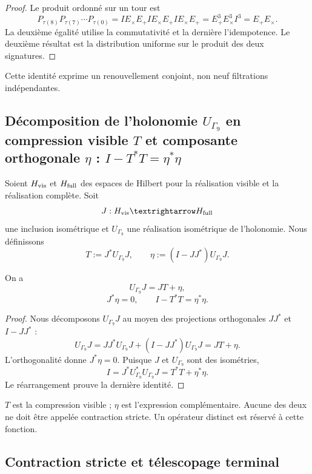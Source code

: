 \begin{proof}
Le produit ordonné sur un tour est
\[
 P_{\tau(8)}P_{\tau(7)}\cdots P_{\tau(0)}
 =I E_\times E_+ I E_\times E_+ I E_\times E_+
 =E_+^3E_\times^3I^3=E_+E_\times.
\]
La deuxième égalité utilise la commutativité et la dernière l'idempotence.
Le deuxième résultat est la distribution uniforme sur le produit des
deux signatures.
\end{proof}

Cette identité exprime un renouvellement conjoint, non neuf filtrations
indépendantes.

\subsection{Décomposition de l'holonomie \(U_{\Gamma_9}\) en compression visible \(T\) et composante orthogonale \(\eta\) : \(I-T^*T=\eta^*\eta\)}

Soient \(\mathcal H_{\rm vis}\) et \(\mathcal H_{\rm full}\) des espaces de
Hilbert pour la réalisation visible et la réalisation complète. Soit
\[
 J:\mathcal H_{\rm vis}\longrightarrow\mathcal H_{\rm full}
\]
une inclusion isométrique et
\(U_{\Gamma_9}\) une réalisation isométrique de l'holonomie. Nous définissons
\[
 T:=J^*U_{\Gamma_9}J,
 \qquad
 \eta:=(I-JJ^*)U_{\Gamma_9}J.
\]

\begin{theorem}
\label{p12-83-c7-s1:thm:conexion-compresion-expresion}
On a
\[
 \boxed{U_{\Gamma_9}J=JT+\eta,}
\]
\[
 J^*\eta=0,
 \qquad
 \boxed{I-T^*T=\eta^*\eta.}
\]
\end{theorem}

\begin{proof}
Nous décomposons \(U_{\Gamma_9}J\) au moyen des projections orthogonales
\(JJ^*\) et \(I-JJ^*\) :
\[
 U_{\Gamma_9}J
 =JJ^*U_{\Gamma_9}J+(I-JJ^*)U_{\Gamma_9}J
 =JT+\eta.
\]
L'orthogonalité donne \(J^*\eta=0\). Puisque \(J\) et
\(U_{\Gamma_9}\) sont des isométries,
\[
 I=J^*U_{\Gamma_9}^*U_{\Gamma_9}J
 =T^*T+\eta^*\eta.
\]
Le réarrangement prouve la dernière identité.
\end{proof}

\(T\) est la compression visible ; \(\eta\) est l'expression complémentaire.
Aucune des deux ne doit être appelée contraction stricte. Un opérateur distinct
est réservé à cette fonction.

\subsection{Contraction stricte et télescopage terminal}

